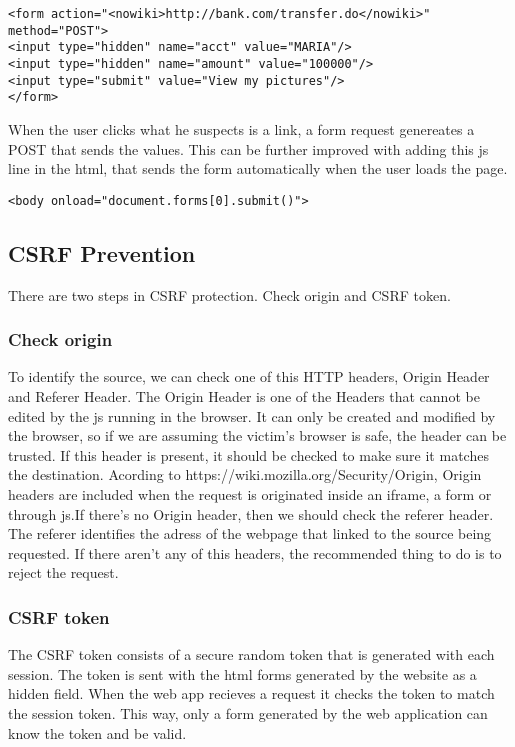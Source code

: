 \begin{verbatim}
<form action="<nowiki>http://bank.com/transfer.do</nowiki>" method="POST">
<input type="hidden" name="acct" value="MARIA"/>
<input type="hidden" name="amount" value="100000"/>
<input type="submit" value="View my pictures"/>
</form>
\end{verbatim}
When the user clicks what he suspects is a link, a form request genereates a POST that sends the values. This can be further improved with adding this js line in the html, that sends the form automatically when the user loads the page.

\begin{verbatim}
<body onload="document.forms[0].submit()">
\end{verbatim}

\subsection{CSRF Prevention}
There are two steps in CSRF protection. Check origin and CSRF token.
\subsubsection{Check origin}
To identify the source, we can check one of this HTTP headers, Origin Header and Referer Header.
The Origin Header is one of the Headers that cannot be edited by the js running in the browser. It can only be created and modified by the browser, so if we are assuming the victim's browser is safe, the header can be trusted. If this header is present, it should be checked to make sure it matches the destination. Acording to https://wiki.mozilla.org/Security/Origin, Origin headers are included when the request is originated inside an iframe, a form or through js.If there's no Origin header, then we should check the referer header. The referer identifies the adress of the webpage that linked to the source being requested. If there aren't any of this headers, the recommended thing to do is to reject the request.
\subsubsection{CSRF token}
The CSRF token consists of a secure random token that is generated with each session. The token is sent with the html forms generated by the website as a hidden field. When the web app recieves a request it checks the token to match the session token. This way, only a form generated by the web application can know the token and be valid.

